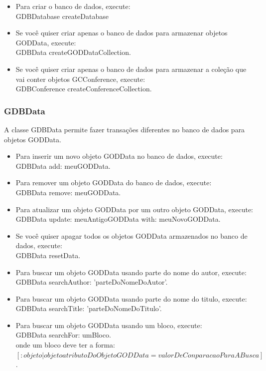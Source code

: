 \documentclass[a4paper, 10pt]{article}
\begin{document}
\begin{newpage}
\begin{itemize}
\item Para criar o banco de dados, execute:\\
{GDBDatabase createDatabase}\\
\item Se você quiser criar apenas o banco de dados para armazenar objetos GODData, execute:\\
{GDBData createGODDataCollection.}\\
\item Se você quiser criar apenas o banco de dados para armazenar a coleção que vai conter objetos GCConference, execute:\\
{GDBConference createConferenceCollection.}
\end{itemize}

\subsubsection{GDBData}
A classe GDBData permite fazer transações diferentes no banco de dados para objetos GODData. 


\begin{itemize}
\item Para inserir um novo objeto GODData no banco de dados, execute:\\
{ GDBData add: meuGODData.}
\item Para remover um objeto GODData do banco de dados, execute:\\
{ GDBData remove: meuGODData.}
\item Para atualizar um objeto GODData por um outro objeto GODData, execute:\\
{ GDBData update: meuAntigoGODData with: meuNovoGODData.}
\item Se você quiser apagar todos os objetos GODData armazenados no banco de dados, execute:\\
{GDBData resetData.}

\item Para buscar um objeto GODData usando parte do nome do autor, execute:\\
{ GDBData searchAuthor: 'parteDoNomeDoAutor'.}
\item Para buscar um objeto GODData usando parte do nome do titulo, execute:\\
{ GDBData searchTitle: 'parteDoNomeDoTitulo'.}
\item Para buscar um objeto GODData usando um bloco, execute:\\
{ GDBData searchFor: umBloco.}\\
onde um bloco deve ter a forma:\\
$[:objeto | objeto atributoDoObjetoGODData = valorDeConparacaoParaABusca]$.


\end{itemize}
\end{newpage}
\end{document}
